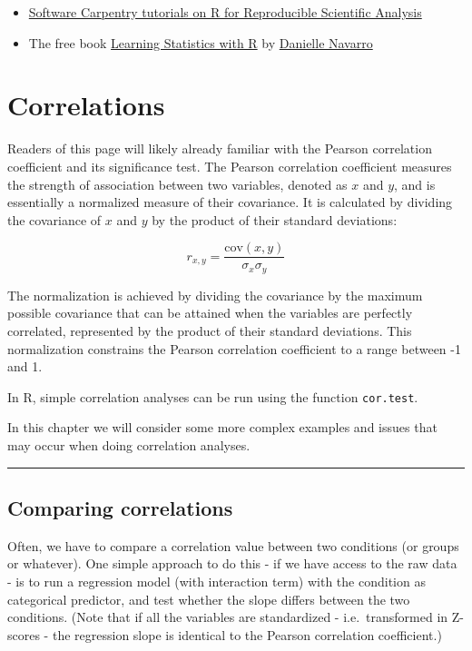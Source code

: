 \documentclass[
]{book}
\providecommand{\tightlist}{%
  \setlength{\itemsep}{0pt}\setlength{\parskip}{0pt}}
\begin{document}
\begin{itemize}
\tightlist
\item
  \href{https://swcarpentry.github.io/r-novice-gapminder/}{Software Carpentry tutorials on R for Reproducible Scientific Analysis}
\item
  The free book \href{https://learningstatisticswithr.com/}{Learning Statistics with R} by \href{https://djnavarro.net/}{Danielle Navarro}
\end{itemize}

\chapter{Correlations}\label{correlation}

Readers of this page will likely already familiar with the Pearson correlation coefficient and its significance test. The Pearson correlation coefficient measures the strength of association between two variables, denoted as \(x\) and \(y\), and is essentially a normalized measure of their covariance. It is calculated by dividing the covariance of \(x\) and \(y\) by the product of their standard deviations:

\[
r_{x,y} = \frac{\text{cov}(x,y)}{\sigma_x \sigma_y}
\]

The normalization is achieved by dividing the covariance by the maximum possible covariance that can be attained when the variables are perfectly correlated, represented by the product of their standard deviations. This normalization constrains the Pearson correlation coefficient to a range between -1 and 1.

In R, simple correlation analyses can be run using the function \texttt{cor.test}.

In this chapter we will consider some more complex examples and issues that may occur when doing correlation analyses.

\begin{center}\rule{0.5\linewidth}{0.5pt}\end{center}

\section{Comparing correlations}\label{comparing-correlations}

Often, we have to compare a correlation value between two conditions (or groups or whatever). One simple approach to do this - if we have access to the raw data - is to run a regression model (with interaction term) with the condition as categorical predictor, and test whether the slope differs between the two conditions. (Note that if all the variables are standardized - i.e.~transformed in Z-scores - the regression slope is identical to the Pearson correlation coefficient.)
\end{document}
